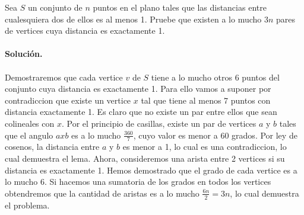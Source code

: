 \documentclass[12pt]{article}
\newenvironment{ejercicio}[2][Ejercicio]{\begin{trivlist}
\item[\hskip \labelsep {\bfseries #1}\hskip \labelsep {\bfseries #2.}]}{\end{trivlist}}
\begin{document}
\begin{ejercicio}{1.1.20}
\end{ejercicio}
Sea $S$ un conjunto de $n$ puntos en el plano tales que las distancias entre cualesquiera dos de ellos es al menos 1. Pruebe que existen a lo mucho $3n$ pares de vertices cuya distancia es exactamente 1.
\\\\
\textbf{Solución.} 
\\\\
Demostraremos que cada vertice $v$ de $S$ tiene a lo mucho otros 6 puntos del conjunto cuya distancia es exactamente 1. Para ello vamos a suponer por contradiccion que existe un vertice $x$ tal que tiene al menos 7 puntos con distancia exactamente 1. Es claro que no existe un par entre ellos que sean colineales con $x$. Por el principio de casillas, existe un par de vertices $a$ y $b$ tales que el angulo $axb$ es a lo mucho $\frac{360}{7}$, cuyo valor es menor a 60 grados. Por ley de cosenos, la distancia entre $a$ y $b$ es menor a 1, lo cual es una contradiccion, lo cual demuestra el lema.
Ahora, consideremos una arista entre 2 vertices si su distancia es exactamente 1. Hemos demostrado que el grado de cada vertice es a lo mucho 6. Si hacemos una sumatoria de los grados en todos los vertices obtendremos que la cantidad de aristas es a lo mucho $\frac{6n}{2} = 3n$, lo cual demuestra el problema.
\end{document}
